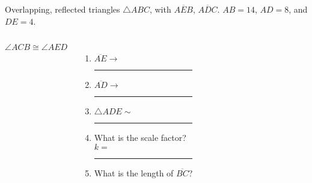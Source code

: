 \documentclass[onlytextwidth, aspectratio=169]{beamer}
\begin{document}
\begin{frame}{Overlapping, reflected triangles}
  $\triangle ABC$, with $\overline{AEB}$, $\overline{ADC}$. $AB=14$, $AD=8$, and $DE=4$.
  \begin{columns}
    $\angle ACB \cong \angle AED$ \vspace{0.25cm}
    \begin{enumerate}
      \item $\overline{AE} \rightarrow$ \rule{2cm}{0.15mm} \vspace{0.15cm}
      \item $\overline{AD} \rightarrow$ \rule{2cm}{0.15mm} \vspace{0.15cm}
      \item $\triangle ADE \sim$ \rule{2cm}{0.15mm} \vspace{0.15cm}
      \item What is the scale factor?\\[0.5cm] $k=$  \rule{2cm}{0.15mm}
      \item What is the length of $\overline{BC}$?  \vspace{1cm}
    \end{enumerate}
    \begin{flushright}
    \end{flushright}
  \end{columns}
\end{frame}
\end{document}
